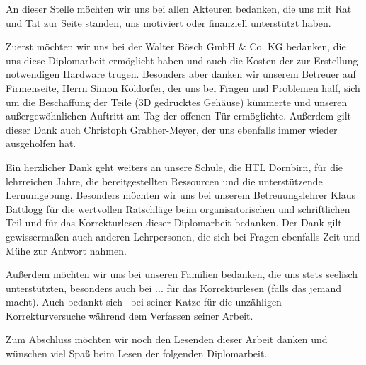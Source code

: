 An dieser Stelle möchten wir uns bei allen Akteuren bedanken, die uns mit Rat und Tat zur Seite standen, uns motiviert oder finanziell unterstützt haben.

Zuerst möchten wir uns bei der Walter Bösch GmbH \& Co. KG bedanken, die uns diese Diplomarbeit ermöglicht haben und auch die Kosten der zur Erstellung notwendigen Hardware trugen. Besonders aber danken wir unserem Betreuer auf Firmenseite, Herrn Simon Köldorfer, der uns bei Fragen und Problemen half, sich um die Beschaffung der Teile (\zB 3D gedrucktes Gehäuse) kümmerte und unseren außergewöhnlichen Auftritt am Tag der offenen Tür ermöglichte. Außerdem gilt dieser Dank auch Christoph Grabher-Meyer, der uns ebenfalls immer wieder ausgeholfen hat.

Ein herzlicher Dank geht weiters an unsere Schule, die HTL Dornbirn, für die lehrreichen Jahre, die bereitgestellten Ressourcen und die unterstützende Lernumgebung. Besonders möchten wir uns bei unserem Betreuungslehrer Klaus Battlogg für die wertvollen Ratschläge beim organisatorischen und schriftlichen Teil und für das Korrekturlesen dieser Diplomarbeit bedanken. Der Dank gilt gewissermaßen auch anderen Lehrpersonen, die sich bei Fragen ebenfalls Zeit und Mühe zur Antwort nahmen.

Außerdem möchten wir uns bei unseren Familien bedanken, die uns stets seelisch unterstützten, besonders auch bei ... für das Korrekturlesen (falls das jemand macht).
Auch bedankt sich \pezze\ bei seiner Katze für die unzähligen Korrekturversuche während dem Verfassen seiner Arbeit.

Zum Abschluss möchten wir noch den Lesenden dieser Arbeit danken und wünschen viel Spaß beim Lesen der folgenden Diplomarbeit.